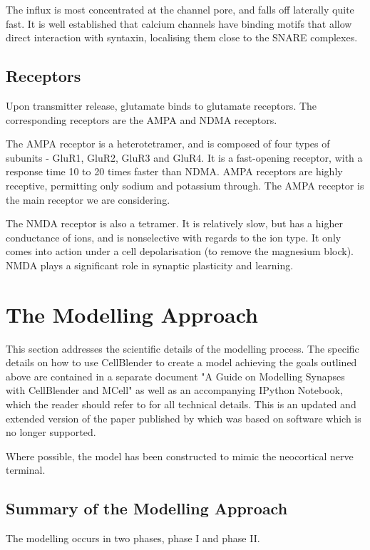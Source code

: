 \documentclass[a4paper]{article}
\begin{document}
The influx is most concentrated at the channel pore, and falls off laterally quite fast. It is well established that calcium channels have binding motifs that allow direct interaction with syntaxin, localising them close to the SNARE complexes.

\subsection{Receptors}
Upon transmitter release, glutamate binds to glutamate receptors. The corresponding receptors are the AMPA and NDMA receptors. 

The AMPA receptor is a heterotetramer, and is composed of four types of subunits - GluR1, GluR2, GluR3 and GluR4. It is a fast-opening receptor, with a response time 10 to 20 times faster than NDMA. AMPA receptors are highly receptive, permitting only sodium and potassium through. The AMPA receptor is the main receptor we are considering.

The NMDA receptor is also a tetramer. It is relatively slow, but has a higher conductance of ions, and is nonselective with regards to the ion type. It only comes into action under a cell depolarisation (to remove the magnesium block). NMDA plays a significant role in synaptic plasticity and learning.

\section{The Modelling Approach}

This section addresses the scientific details of the modelling process. The specific details on how to use CellBlender to create a model achieving the goals outlined above are contained in a separate document "A Guide on Modelling Synapses with CellBlender and MCell" as well as an accompanying IPython Notebook, which the reader should refer to for all technical details. This is an updated and extended version of the paper published by \cite{Czech:MethodsMolBiol:2009} which was based on software which is no longer supported.

Where possible, the model has been constructed to mimic the neocortical nerve terminal.

\subsection{Summary of the Modelling Approach}
The modelling occurs in two phases, phase I and phase II.
\end{document}
